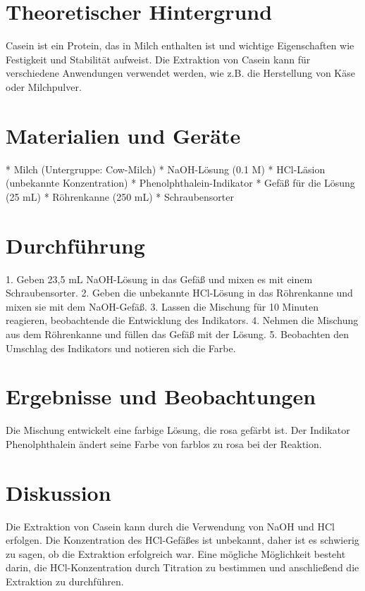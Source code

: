 \documentclass{article}%
\begin{document}
%
\normalsize%
\pagestyle{fancy}%
\fancyhf{}%
%
\fancyhead{[R]{\today}}%
%
\section{Theoretischer Hintergrund}%
\label{sec:TheoretischerHintergrund}%
Casein ist ein Protein, das in Milch enthalten ist und wichtige Eigenschaften wie Festigkeit und Stabilität aufweist. Die Extraktion von Casein kann für verschiedene Anwendungen verwendet werden, wie z.B. die Herstellung von Käse oder Milchpulver.

%
\section{Materialien und Geräte}%
\label{sec:MaterialienundGerte}%
* Milch (Untergruppe: Cow-Milch)
* NaOH-Lösung (0.1 M)
* HCl-Läsion (unbekannte Konzentration)
* Phenolphthalein-Indikator
* Gefäß für die Lösung (25 mL)
* Röhrenkanne (250 mL)
* Schraubensorter

%
\section{Durchführung}%
\label{sec:Durchfhrung}%
1. Geben 23,5 mL NaOH-Lösung in das Gefäß und mixen es mit einem Schraubensorter.
2. Geben die unbekannte HCl-Lösung in das Röhrenkanne und mixen sie mit dem NaOH-Gefäß.
3. Lassen die Mischung für 10 Minuten reagieren, beobachtende die Entwicklung des Indikators.
4. Nehmen die Mischung aus dem Röhrenkanne und füllen das Gefäß mit der Lösung.
5. Beobachten den Umschlag des Indikators und notieren sich die Farbe.

%
\section{Ergebnisse und Beobachtungen}%
\label{sec:ErgebnisseundBeobachtungen}%
Die Mischung entwickelt eine farbige Lösung, die rosa gefärbt ist. Der Indikator Phenolphthalein ändert seine Farbe von farblos zu rosa bei der Reaktion.

%
\section{Diskussion}%
\label{sec:Diskussion}%
Die Extraktion von Casein kann durch die Verwendung von NaOH und HCl erfolgen. Die Konzentration des HCl-Gefäßes ist unbekannt, daher ist es schwierig zu sagen, ob die Extraktion erfolgreich war. Eine mögliche Möglichkeit besteht darin, die HCl-Konzentration durch Titration zu bestimmen und anschließend die Extraktion zu durchführen.

%
\end{document}

